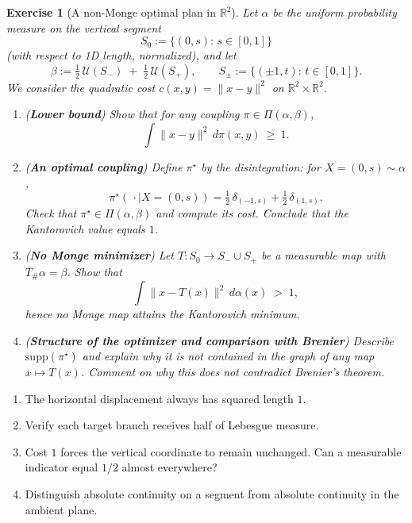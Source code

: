 \documentclass[11pt,a4paper]{article}
\theoremstyle{exostyle}
\newtheorem{exercise}{Exercise}
\newcommand{\R}{\mathbb{R}}
\newcommand{\push}{\#}
\newcommand{\Unif}{\mathcal U}
\begin{document}
\begin{exercise}[A non-Monge optimal plan in $\R^2$]\label{ex:split-segment}
Let $\alpha$ be the uniform probability measure on the vertical segment
\[
S_0:=\{(0,s):\,s\in[0,1]\}
\]
(with respect to 1D length, normalized), and let
\[
\beta:=\tfrac12\,\Unif(S_-)\;+\;\tfrac12\,\Unif(S_+),
\qquad
S_\pm:=\{(\pm1,t):\,t\in[0,1]\}.
\]
We consider the quadratic cost $c(x,y)=\|x-y\|^2$ on $\R^2\times\R^2$.

\begin{enumerate}[label=(\alph*), itemsep=4pt]
\item (\textbf{Lower bound}) Show that for any coupling $\pi\in\Pi(\alpha,\beta)$,
\[
\int \|x-y\|^2\,d\pi(x,y)\ \ge\ 1.
\]

\item (\textbf{An optimal coupling}) Define $\pi^\star$ by the disintegration:
for $X=(0,s)\sim\alpha$,
\[
\pi^\star(\,\cdot\mid X=(0,s))=\tfrac12\,\delta_{(-1,s)}+\tfrac12\,\delta_{(1,s)}.
\]
Check that $\pi^\star\in\Pi(\alpha,\beta)$ and compute its cost. Conclude that the Kantorovich value equals $1$.

\item (\textbf{No Monge minimizer}) Let $T:S_0\to S_-\cup S_+$ be a measurable map with $T_{\push}\alpha=\beta$.
Show that
\[
\int \|x-T(x)\|^2\,d\alpha(x) \;>\; 1,
\]
hence no Monge map attains the Kantorovich minimum.

\item (\textbf{Structure of the optimizer and comparison with Brenier})
Describe $\mathrm{supp}(\pi^\star)$ and explain why it is not contained in the graph of any map $x\mapsto T(x)$.
Comment on why this does not contradict Brenier's theorem.
\end{enumerate}
\end{exercise}
\begin{hints}
\begin{enumerate}[label=(\alph*)]\item The horizontal displacement always has squared length $1$.\item Verify each target branch receives half of Lebesgue measure.\item Cost $1$ forces the vertical coordinate to remain unchanged. Can a measurable indicator equal $1/2$ almost everywhere?\item Distinguish absolute continuity on a segment from absolute continuity in the ambient plane.\end{enumerate}
\end{hints}
\end{document}
